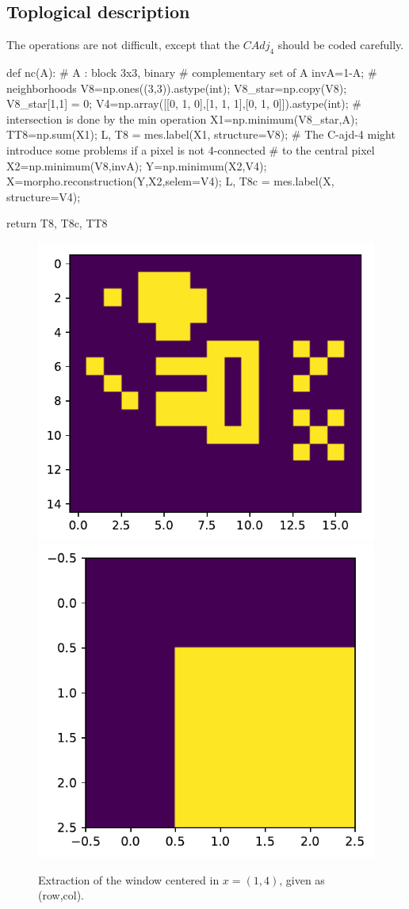 \def\QRCODE{TB_IPR_TUT.IMG.pixel_topological_description_pythonqrcode.png}
\def\QRPAGE{http://www.iptutorials.science/tree/master/TB_IPR/TUT.IMG.pixel_topological_description/python}


\subsection{Toplogical description}
The operations are not difficult, except that the $CAdj_4$ should be coded carefully.

\begin{python}
def nc(A):
    # A : block 3x3, binary
    # complementary set of A
    invA=1-A;
    # neighborhoods
    V8=np.ones((3,3)).astype(int);
    V8_star=np.copy(V8);
    V8_star[1,1] = 0;
    V4=np.array([[0, 1, 0],[1, 1, 1],[0, 1, 0]]).astype(int);
    # intersection is done by the min operation
    X1=np.minimum(V8_star,A);
    TT8=np.sum(X1);
    L, T8 = mes.label(X1, structure=V8);
    # The C-ajd-4 might introduce some problems if a pixel is not 4-connected
    # to the central pixel
    X2=np.minimum(V8,invA);
    Y=np.minimum(X2,V4);
    X=morpho.reconstruction(Y,X2,selem=V4);
    L, T8c = mes.label(X, structure=V4);
    
    return T8, T8c, TT8
\end{python}

\begin{figure}[htbp]
\centering
\includegraphics[width=.4\textwidth]{original.pdf}\hspace{15mm}
\includegraphics[width=.3\textwidth]{window.pdf}
\caption{Extraction of the window centered in $x=(1,4)$, given as (row,col).}
\label{fig:topological_description:python:example}
\end{figure}


